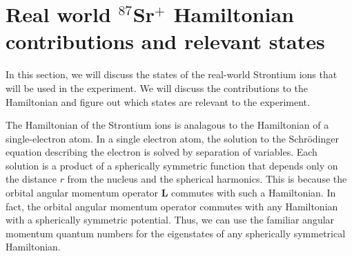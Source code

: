 

%



\section{Real world $^{87}$Sr$^+$ Hamiltonian contributions and relevant states}

In this section, we will discuss the states of the real-world Strontium ions that will be used in the experiment. We will discuss the contributions to the Hamiltonian and figure out which states are relevant to the experiment. 

The Hamiltonian of the Strontium ions is analagous to the Hamiltonian of a single-electron atom. 
In a single electron atom, the solution to the Schr\"odinger equation describing the electron is solved by separation of variables.
 Each solution is a product of a spherically symmetric function that depends only on the distance $r$ from the nucleus and the spherical harmonics.
This is because the orbital angular momentum operator $\mathbf{L}$ commutes with such a Hamiltonian. In fact, the orbital angular momentum operator commutes with any Hamiltonian with a spherically symmetric potential.
Thus, we can use the familiar angular momentum quantum numbers for the eigenstates of any spherically symmetrical Hamiltonian.

